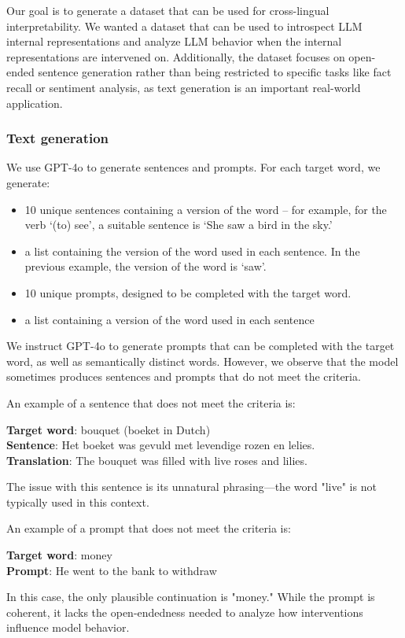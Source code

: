 Our goal is to generate a dataset that can be used for cross-lingual interpretability. We wanted a dataset that can be used to introspect LLM internal representations and analyze LLM behavior when the internal representations are intervened on.
Additionally, the dataset focuses on open-ended sentence generation rather than being restricted to specific tasks like fact recall or sentiment analysis, as text generation is an important real-world application. 

\subsubsection{Text generation}
We use GPT-4o to generate sentences and prompts. For each target word, we generate:
\begin{itemize}
    \item 10 unique sentences containing a version of the word -- for example, for the verb `(to) see', a suitable sentence is `She saw a bird in the sky.'
    \item a list containing the version of the word used in each sentence. In the previous example, the version of the word is `saw'. 
    \item 10 unique prompts, designed to be completed with the target word.
    \item a list containing a version of the word used in each sentence
\end{itemize}

We instruct GPT-4o to generate prompts that can be completed with the target word, as well as semantically distinct words. 
However, we observe that the model sometimes produces sentences and prompts that do not meet the criteria.

An example of a sentence that does not meet the criteria is:
\begin{displayquote}
\textbf{Target word}: bouquet (boeket in Dutch) \\
\textbf{Sentence}: Het boeket was gevuld met levendige rozen en lelies. \\
\textbf{Translation}: The bouquet was filled with live roses and lilies.
\end{displayquote}
The issue with this sentence is its unnatural phrasing—the word "live" is not typically used in this context.

An example of a prompt that does not meet the criteria is:
\begin{displayquote}
\textbf{Target word}: money \\
\textbf{Prompt}: He went to the bank to withdraw
\end{displayquote}
In this case, the only plausible continuation is "money." While the prompt is coherent, it lacks the open-endedness needed to analyze how interventions influence model behavior.

